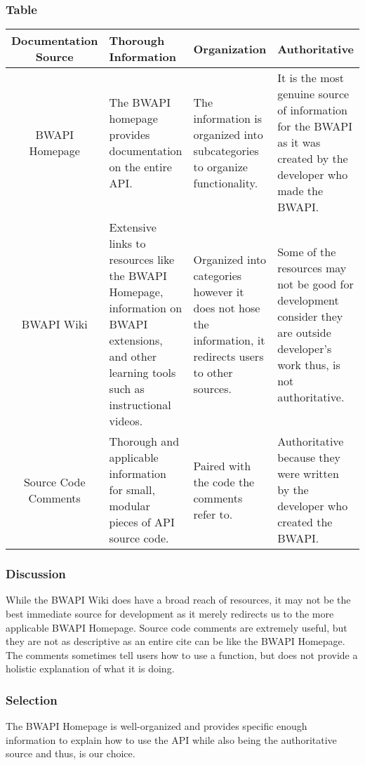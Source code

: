 \subsubsection{Table}
\begin{center}
	\begin{tabular}{ ||C|M|M|M|| } 
		\hline
		Documentation Source & Thorough Information & Organization & Authoritative \\
		\hline
		BWAPI Homepage & The BWAPI homepage provides documentation on the entire API. & The information is organized into subcategories to organize functionality. & It is the most genuine source of information for the BWAPI as it was created by the developer who made the BWAPI. \\ 
		\hline
		BWAPI Wiki & Extensive links to resources like the BWAPI Homepage, information on BWAPI extensions, and other learning tools such as instructional videos. & Organized into categories however it does not hose the information, it redirects users to other sources. & Some of the resources may not be good for development consider they are outside developer's work thus, is not authoritative.  \\ 
		\hline
		Source Code Comments & Thorough and applicable information for small, modular pieces of API source code. & Paired with the code the comments refer to. & Authoritative because they were written by the developer who created the BWAPI. \\ 
		\hline
	\end{tabular}
\end{center}
\subsubsection{Discussion}
While the BWAPI Wiki does have a broad reach of resources, it may not be the best immediate source for development as it merely redirects us to the more applicable BWAPI Homepage. Source code comments are extremely useful, but they are not as descriptive as an entire cite can be like the BWAPI Homepage. The comments sometimes tell users how to use a function, but does not provide a holistic explanation of what it is doing.
\subsubsection{Selection}
The BWAPI Homepage is well-organized and provides specific enough information to explain how to use the API while also being the authoritative source and thus, is our choice.


